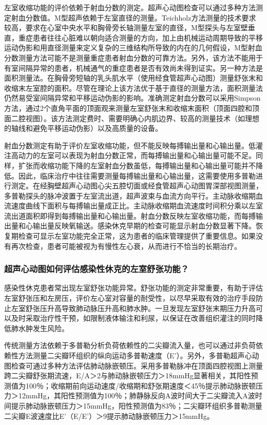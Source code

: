 左室收缩功能的评价依赖于射血分数的测定。超声心动图检查可以通过多种方法测定射血分数值。M型超声依赖于左室直径的测量。Teichholz方法测量的技术要求较高，要求在心室中央水平和胸骨旁长轴测量左室的直径，M型探头与左室壁垂直，重症患者往往心脏难以朝向适合测量的方向，加上由机械运动周期导致的平移运动伪影和用直径测量来定义复杂的三维结构所导致的内在的几何假设，M型射血分数测量方法可能不是测量重症患者射血分数的可靠方法。另外，该方法不能用于有室间隔异常的患者，机械通气的重症患者是否有效尚未得到证实。另一种方法是面积测量法。在胸骨旁短轴的乳头肌水平（使用经食管超声心动图）测量舒张末和收缩末左室腔的面积。尽管在理论上该方法优于基于直径的测量方法，面积测量法仍然易受室间隔异常和平移运动伪影的影响。准确测定射血分数可以采用Simpson方法，通过2个直角平面的顶面观来测量左室舒张末和收缩末面积（顶面四腔和顶面二腔视图）。该方法测定费时、需要明确心内肌边界、较高的测量技术（如理想的轴线和避免平移运动伪影）以及高质量的设备。

射血分数测定有助于评价左室收缩功能，但不能反映每搏输出量和心输出量。低灌注高动力的左室可以表现为射血分数正常，而每搏输出量和心输出量可能不足。同样，扩张而收缩功能下降的左室射血分数虽低，每搏输出量和心输出量可能并不降低。因此，临床治疗中往往需要测量每搏输出量和心输出量，这需要使用多普勒进行测定。在经胸壁超声心动图心尖五腔切面或经食管超声心动图胃深部视图测量，多普勒探头的脉冲波置于左室流出道，超声波束与血流方向平行。主动脉收缩期血流速度曲线下面积与每搏输出量成正比。主动脉收缩期血流速度时间积分乘以左室流出道面积即得到每搏输出量和心输出量。射血分数反映左室收缩功能，而每搏输出量和心输出量反映氧输送。感染休克早期的检查可能显示射血分数显著下降。恢复期检查可显示左室功能完全正常，这为患者的临床管理提供了重要信息。如果没有再次检查，患者可能被视为有慢性左心衰，从而进行不恰当的长期治疗。

\subsubsection{超声心动图如何评估感染性休克的左室舒张功能？}

感染性休克患者常出现左室舒张功能异常。舒张功能的测定非常重要，有助于评估左室舒张压和左房压，评价左心室对容量的耐受性，以尽早采取有效的治疗手段防止左室舒张压升高导致肺动脉压升高和肺水肿。一旦发现左室舒张末期压力升高可以及时采取治疗性干预，如限制液体输注和利尿，以保证在改善组织灌注的同时降低肺水肿发生风险。

传统测量方法依赖于多普勒分析负荷依赖性的二尖瓣流入量，也可以通过非负荷依赖性方法测量二尖瓣环组织的纵向运动多普勒速度（E'）。另外，多普勒超声心动图检查可通过多种方法评估肺动脉嵌顿压。采用多普勒脉冲在顶面四腔视图上测量跨二尖瓣舒张期流速，E/A＞2与肺动脉嵌顿压力＞18mmHg显著相关，其阳性预测值为100％；收缩期前向运动速度/收缩期和舒张期速度＜45％提示肺动脉嵌顿压力＞12mmHg，其阳性预测值为100％；肺静脉反向A波时间大于二尖瓣流入A波时间提示肺动脉嵌顿压力＞15mmHg，阳性预测值为83％；二尖瓣环组织多普勒测量二尖瓣E波速度比E'（E/E'）＞9提示肺动脉嵌顿压力＞15mmHg。

